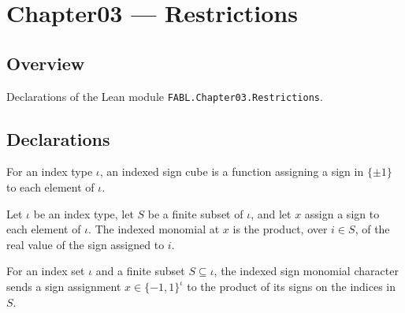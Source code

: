 \chapter{Chapter03 — Restrictions}
\section{Overview}

Declarations of the Lean module \texttt{FABL.Chapter03.Restrictions}.

\section{Declarations}

\begin{definition}
\label{FABL.IndexedSignCube}
\leanok
{}
For an index type $\iota$, an indexed sign cube is a function assigning a sign in
$\{\pm1\}$ to each element of $\iota$.
\end{definition}

\begin{definition}
\label{FABL.indexedMonomial}
\leanok
{}
Let $\iota$ be an index type, let $S$ be a finite subset of $\iota$, and let $x$ assign
a sign to each element of $\iota$. The indexed monomial at $x$ is the product, over
$i\in S$, of the real value of the sign assigned to $i$.
\end{definition}

\begin{definition}
\label{FABL.indexedSignMonomialChar}
\leanok
{}
For an index set $\iota$ and a finite subset $S\subseteq\iota$, the indexed sign
monomial character sends a sign assignment $x\in\{−1,1\}^{\iota}$ to the product of its
signs on the indices in $S$.
\end{definition}

